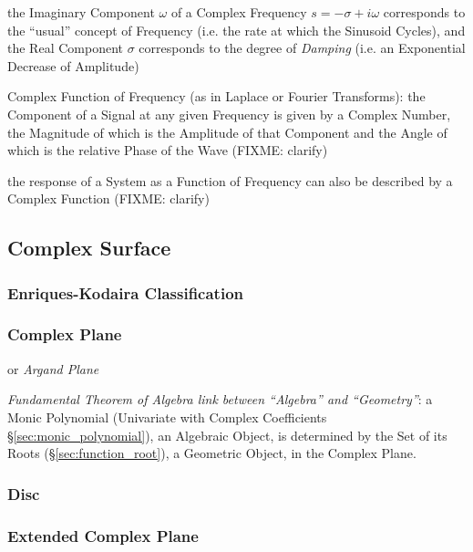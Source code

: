 the Imaginary Component $\omega$ of a Complex Frequency $s = -\sigma + i\omega$
corresponds to the ``usual'' concept of Frequency (i.e. the rate at which the
Sinusoid Cycles), and the Real Component $\sigma$ corresponds to the degree of
\emph{Damping} (i.e. an Exponential Decrease of Amplitude)

Complex Function of Frequency (as in Laplace or Fourier Transforms): the
Component of a Signal at any given Frequency is given by a Complex Number, the
Magnitude of which is the Amplitude of that Component and the Angle of which is
the relative Phase of the Wave (FIXME: clarify)

the response of a System as a Function of Frequency can also be described by a
Complex Function (FIXME: clarify)



\subsection{Complex Surface}\label{sec:complex_surface}

\subsubsection{Enriques-Kodaira Classification}
\label{sec:enriques_kodaira}

\subsubsection{Complex Plane}\label{sec:complex_plane}

or \emph{Argand Plane}

\emph{Fundamental Theorem of Algebra link between ``Algebra'' and
  ``Geometry''}: a Monic Polynomial (Univariate with Complex Coefficients
\S\ref{sec:monic_polynomial}), an Algebraic Object, is determined by the Set of
its Roots (\S\ref{sec:function_root}), a Geometric Object, in the Complex
Plane.



\subsubsection{Disc}\label{sec:disc}\hfill

\subsubsection{Extended Complex Plane}\label{sec:extended_complex_plane}

